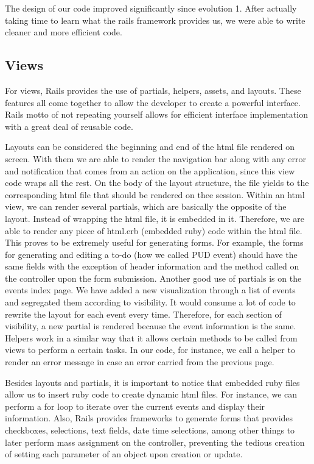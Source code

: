 \documentclass[11pt]{article}
\begin{document}
The design of our code improved significantly since evolution 1. After actually taking time to learn what the rails framework provides us, we were able to write cleaner and more efficient code.

\subsection{Views}

For views, Rails provides the use of partials, helpers, assets, and layouts. These features all come together to allow the developer to create a powerful interface. Rails motto of not repeating yourself allows for efficient interface implementation with a great deal of reusable code.

Layouts can be considered the beginning and end of the html file rendered on screen. With them we are able to render the navigation bar along with any error and notification that comes from an action on the application, since this view code wraps all the rest. On the body of the layout structure, the file yields to the corresponding html file that should be rendered on thee session. Within an html view, we can render several partials, which are basically the opposite of the layout. Instead of wrapping the html file, it is embedded in it. Therefore, we are able to render any piece of html.erb (embedded ruby) code within the html file. This proves to be extremely useful for generating forms. For example, the forms for generating and editing a to-do (how we called PUD event) should have the same fields with the exception of header information and the method called on the controller upon the form submission. Another good use of partials is on the events index page. We have added a new visualization through a list of events and segregated them according to visibility. It would consume a lot of code to rewrite the layout for each event every time. Therefore, for each section of visibility, a new partial is rendered because the event information is the same. Helpers work in a similar way that it allows certain methods to be called from views to perform a certain tasks. In our code, for instance, we call a helper to render an error message in case an error carried from the previous page.

Besides layouts and partials, it is important to notice that embedded ruby files allow us to insert ruby code to create dynamic html files. For instance, we can perform a for loop to iterate over the current events and display their information. Also, Rails provides frameworks to generate forms that provides checkboxes, selections, text fields, date time selections, among other things to later perform mass assignment on the controller, preventing the tedious creation of setting each parameter of an object upon creation or update.
\end{document}
